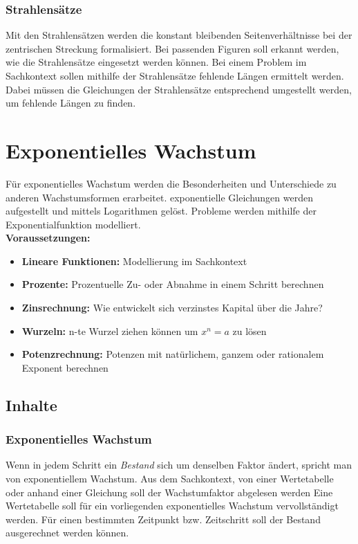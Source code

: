 \documentclass{article}
\begin{document}
\subsubsection*{Strahlensätze}
Mit den Strahlensätzen werden die konstant bleibenden Seitenverhältnisse bei der zentrischen Streckung formalisiert.
Bei passenden Figuren soll erkannt werden, wie die Strahlensätze eingesetzt werden können.
Bei einem Problem im Sachkontext sollen mithilfe der Strahlensätze fehlende Längen ermittelt werden.
Dabei müssen die Gleichungen der Strahlensätze entsprechend umgestellt werden, um fehlende Längen zu finden.
\newpage
\section{Exponentielles Wachstum}
Für exponentielles Wachstum werden die Besonderheiten und Unterschiede zu anderen Wachstumsformen erarbeitet.
exponentielle Gleichungen werden aufgestellt und mittels Logarithmen gelöst.
Probleme werden mithilfe der Exponentialfunktion modelliert.\\
\textbf{Voraussetzungen: }
\begin{itemize}
    \item \textbf{Lineare Funktionen: } Modellierung im Sachkontext
    \item \textbf{Prozente: } Prozentuelle Zu- oder Abnahme in einem Schritt berechnen
    \item \textbf{Zinsrechnung: } Wie entwickelt sich verzinstes Kapital über die Jahre? 
    \item \textbf{Wurzeln: } n-te Wurzel ziehen können um $x^n = a$ zu lösen
    \item \textbf{Potenzrechnung: } Potenzen mit natürlichem, ganzem oder rationalem Exponent berechnen
\end{itemize}
\subsection{Inhalte}
\subsubsection*{Exponentielles Wachstum}
Wenn in jedem Schritt ein \textit{Bestand} sich um denselben Faktor ändert, spricht man von exponentiellem Wachstum.
Aus dem Sachkontext, von einer Wertetabelle oder anhand einer Gleichung soll der Wachstumfaktor abgelesen werden
Eine Wertetabelle soll für ein vorliegenden exponentielles Wachstum vervollständigt werden.
Für einen bestimmten Zeitpunkt bzw. Zeitschritt soll der Bestand ausgerechnet werden können.
\end{document}

